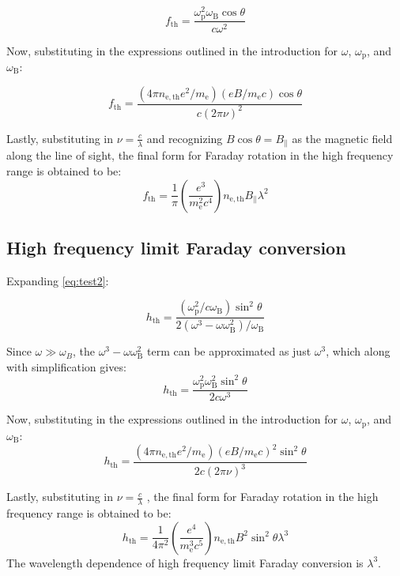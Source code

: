 \documentclass[apj]{emulateapj}
\begin{document}
$$
f_{\mathrm{th}}=\frac{\omega_{\mathrm{p}}^2 \omega_{\mathrm{B}} \cos \theta} {c \omega^2}
$$


Now, substituting in the expressions outlined in the introduction for $\omega$,  $\omega_{\mathrm{p}}$, and $
\omega_{\mathrm{B}}$:

$$
f_{\mathrm{th}}=\frac{\left(4 \pi n_{\mathrm{e}, \mathrm{th}} e^2 / m_{\mathrm{e}}\right)\left(e B / m_{\mathrm{e}} c\right) \cos \theta} {c {(2\pi \nu)}^2}
$$

Lastly, substituting in $\nu = \frac{c}{\lambda}$ and recognizing $B \cos\theta = B_{\|}$ as the magnetic field along the line of sight, the final form  for Faraday rotation in the high frequency range is obtained to be:
\begin{equation} \label{eq:test4}
f_{\mathrm{th}}=\frac{1}{\pi}\left(\frac{e^3}{m_{\mathrm{e}}^2 c^4}\right) n_{\mathrm{e}, \mathrm{th}} B_{\|} \lambda^2
\end{equation}

\subsection{High frequency limit Faraday conversion}
Expanding \eqref{eq:test2}: 


$$
h_{\mathrm{th}} =\frac{\left(\omega_{\mathrm{p}}^2 / c \omega_{\mathrm{B}}\right) \sin ^2 \theta}{2(\omega^3  - \omega\omega_{\mathrm{B}}^2)/\omega_{\mathrm{B}}}
$$


Since $\omega \gg \omega_B$, the $\omega^3  - \omega\omega_{\mathrm{B}}^2 $ term can be approximated as just ${\omega^3}$, which along with simplification gives: 
$$
h_{\mathrm{th}} =\frac{\omega_{\mathrm{p}}^2 \omega_{\mathrm{B}}^2\sin ^2 \theta}{2c\omega^3}
$$

Now, substituting in the expressions outlined in the introduction for $\omega$,  $\omega_{\mathrm{p}}$, and $
\omega_{\mathrm{B}}$:
$$
h_{\mathrm{th}} =\frac{(4 \pi n_{\mathrm{e}, \mathrm{th}} e^2 / m_{\mathrm{e}}){(e B / m_{\mathrm{e}} c )}^2\sin ^2 \theta}{2c{(2 \pi \nu)}^3}
$$


Lastly, substituting in $\nu = \frac{c}{\lambda}$ , the final form  for Faraday rotation in the high frequency range is obtained to be:
\begin{equation}\label{eq:test5}
h_{\mathrm{th}}=\frac{1}{4 \pi^2}\left(\frac{e^4}{m_{\mathrm{e}}^3 c^5}\right) n_{\mathrm{e}, \mathrm{th}} B^2 \sin ^2 \theta\lambda^3
\end{equation}
The wavelength dependence of high frequency limit Faraday conversion is ${{\lambda}^3}$. 
\end{document}
